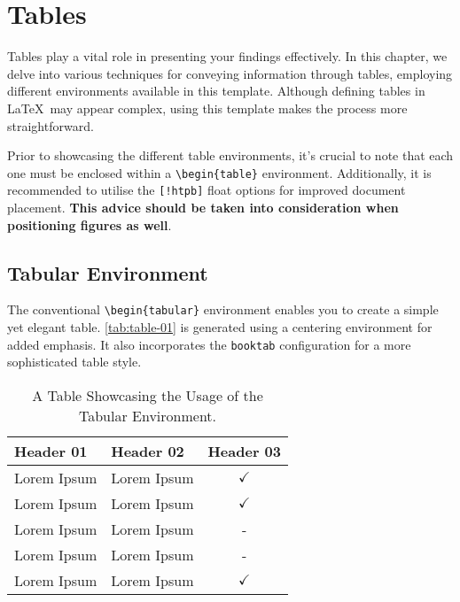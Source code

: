 \chapter{Tables}
Tables play a vital role in presenting your findings effectively. In this chapter, we delve into various techniques for conveying information through tables, employing different environments available in this template. Although defining tables in \LaTeX\ may appear complex, using this template makes the process more straightforward.

\begin{importantbox}
    Prior to showcasing the different table environments, it's crucial to note that each one must be enclosed within a \verb|\begin{table}| environment. Additionally, it is recommended to utilise the \verb|[!htpb]| float options for improved document placement. \textbf{This advice should be taken into consideration when positioning figures as well}.
\end{importantbox}

\section{Tabular Environment}
The conventional \verb|\begin{tabular}| environment enables you to create a simple yet elegant table. \autoref{tab:table-01} is generated using a centering environment for added emphasis. It also incorporates the \verb|booktab| configuration for a more sophisticated table style.

\begin{table}[!htpb]
    \caption{A Table Showcasing the Usage of the Tabular Environment.}
    \label{tab:table-01}
    \centering
    \begin{tabular}{llc}
        \toprule
        Header 01 & Header 02 & Header 03 \\ 
        \midrule
        Lorem Ipsum & Lorem Ipsum & $\checkmark$ \\
        Lorem Ipsum & Lorem Ipsum & $\checkmark$ \\
        Lorem Ipsum & Lorem Ipsum & - \\
        Lorem Ipsum & Lorem Ipsum & - \\
        Lorem Ipsum & Lorem Ipsum & $\checkmark$ \\
        \bottomrule
    \end{tabular}
\end{table}

